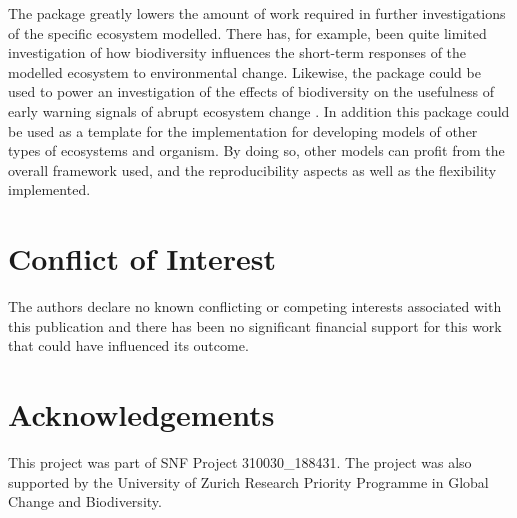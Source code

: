 \documentclass[]{elsarticle} %
\begin{document}
The package greatly lowers the amount of work required in further
investigations of the specific ecosystem modelled. There has, for
example, been quite limited investigation of how biodiversity influences
the short-term responses of the modelled ecosystem to environmental
change. Likewise, the package could be used to power an investigation of
the effects of biodiversity on the usefulness of early warning signals
of abrupt ecosystem change \citep{Scheffer2009}. In addition this
package could be used as a template for the implementation for
developing models of other types of ecosystems and organism. By doing
so, other models can profit from the overall framework used, and the
reproducibility aspects as well as the flexibility implemented.

\hypertarget{conflict-of-interest}{%
\section{Conflict of Interest}\label{conflict-of-interest}}

The authors declare no known conflicting or competing interests
associated with this publication and there has been no significant
financial support for this work that could have influenced its outcome.

\hypertarget{acknowledgements}{%
\section{Acknowledgements}\label{acknowledgements}}

This project was part of SNF Project 310030\_188431. The project was
also supported by the University of Zurich Research Priority Programme
in Global Change and Biodiversity.

\renewcommand\refname{References}

\end{document}
